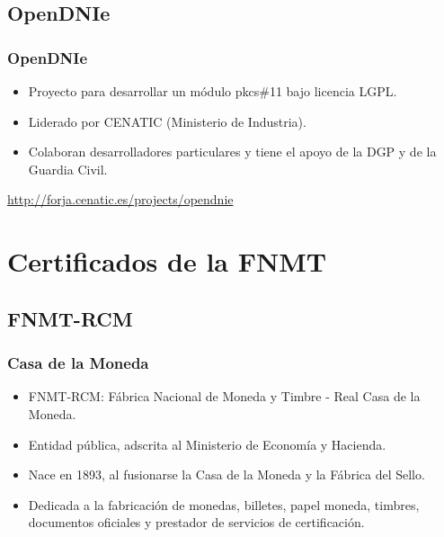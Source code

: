 \documentclass{beamer}
\begin{document}
\subsection{OpenDNIe}
\begin{frame}
\frametitle{OpenDNIe}

\begin{itemize}
\item Proyecto para desarrollar un módulo pkcs\#11 bajo licencia LGPL. 
\item Liderado por CENATIC (Ministerio de Industria).
\item Colaboran desarrolladores particulares y tiene el apoyo de la DGP y de la Guardia Civil.
\end{itemize}

\smallskip

\begin{center}
\url{http://forja.cenatic.es/projects/opendnie}
\end{center}

\end{frame}


\section{Certificados de la FNMT}

\subsection{FNMT-RCM}

\begin{frame}
\frametitle{Casa de la Moneda}

\begin{itemize}
\item \alert{FNMT-RCM}: Fábrica Nacional de Moneda y Timbre - Real Casa de la Moneda.
\item Entidad pública, adscrita al Ministerio de Economía y Hacienda.
\item Nace en 1893, al fusionarse la Casa de la Moneda y la Fábrica del Sello.
\item Dedicada a la fabricación de monedas, billetes, papel moneda, timbres, documentos oficiales y prestador de \alert{servicios de certificación}.
\end{itemize}

\end{frame}
\end{document}
